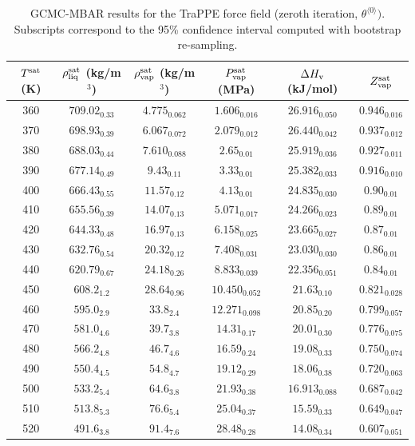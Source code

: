 \documentclass[journal=jctc,manuscript=article]{achemso}
\begin{document}
	\begin{table}[htb!]
		\caption{GCMC-MBAR results for the TraPPE force field (zeroth iteration, $\theta^{\langle0\rangle})$. Subscripts correspond to the 95\% confidence interval computed with bootstrap re-sampling.}
		\begin{center}
			\begin{tabular}{|c|c|c|c|c|c|}
				\hline
				$T^{\rm sat}$ (K) & $\rho_{\rm liq}^{\rm sat}$ (kg/m$^3$) & $\rho_{\rm vap}^{\rm sat}$ (kg/m$^3$) & $P_{\rm vap}^{\rm sat}$ (MPa) & $\Delta H_{\rm v}$ (kJ/mol) & $Z_{\rm vap}^{\rm sat}$ \\ \hline
				360 & $709.02_{0.33}$ & $4.775_{0.062}$ & $1.606_{0.016}$ & $26.916_{0.050}$ & $0.946_{0.016}$ \\
				370 & $698.93_{0.39}$ & $6.067_{0.072}$ & $2.079_{0.012}$ & $26.440_{0.042}$ & $0.937_{0.012}$ \\
				380 & $688.03_{0.44}$ & $7.610_{0.088}$ & $2.65_{0.01}$ & $25.919_{0.036}$ & $0.927_{0.011}$ \\
				390 & $677.14_{0.49}$ & $9.43_{0.11}$ & $3.33_{0.01}$ & $25.382_{0.033}$ & $0.916_{0.010}$ \\
				400 & $666.43_{0.55}$ & $11.57_{0.12}$ & $4.13_{0.01}$ & $24.835_{0.030}$ & $0.90_{0.01}$ \\
				410 & $655.56_{0.39}$ & $14.07_{0.13}$ & $5.071_{0.017}$ & $24.266_{0.023}$ & $0.89_{0.01}$ \\
				420 & $644.33_{0.48}$ & $16.97_{0.13}$ & $6.158_{0.025}$ & $23.665_{0.027}$ & $0.87_{0.01}$ \\
				430 & $632.76_{0.54}$ & $20.32_{0.12}$ & $7.408_{0.031}$ & $23.030_{0.030}$ & $0.86_{0.01}$ \\
				440 & $620.79_{0.67}$ & $24.18_{0.26}$ & $8.833_{0.039}$ & $22.356_{0.051}$ & $0.84_{0.01}$ \\
				450 & $608.2_{1.2}$ & $28.64_{0.96}$ & $10.450_{0.052}$ & $21.63_{0.10}$ & $0.821_{0.028}$ \\
				460 & $595.0_{2.9}$ & $33.8_{2.4}$ & $12.271_{0.098}$ & $20.85_{0.20}$ & $0.799_{0.057}$ \\
				470 & $581.0_{4.6}$ & $39.7_{3.8}$ & $14.31_{0.17}$ & $20.01_{0.30}$ & $0.776_{0.075}$ \\
				480 & $566.2_{4.8}$ & $46.7_{4.6}$ & $16.59_{0.24}$ & $19.08_{0.33}$ & $0.750_{0.074}$ \\
				490 & $550.4_{4.5}$ & $54.8_{4.7}$ & $19.12_{0.29}$ & $18.06_{0.38}$ & $0.720_{0.063}$ \\
				500 & $533.2_{5.4}$ & $64.6_{3.8}$ & $21.93_{0.38}$ & $16.913_{0.088}$ & $0.687_{0.042}$ \\
				510 & $513.8_{5.3}$ & $76.6_{5.4}$ & $25.04_{0.37}$ & $15.59_{0.33}$ & $0.649_{0.047}$ \\
				520 & $491.6_{3.8}$ & $91.4_{7.6}$ & $28.48_{0.28}$ & $14.08_{0.34}$ & $0.607_{0.051}$ \\
				\hline
			\end{tabular}
		\end{center}
	\end{table}
\end{document}
